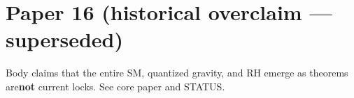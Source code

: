 \documentclass[11pt]{article}
\begin{document}
\section*{Paper 16 (historical overclaim — superseded)}
Body claims that the entire SM, quantized gravity, and RH emerge as theorems are\n\textbf{not} current locks. See core paper and STATUS.
\end{document}
